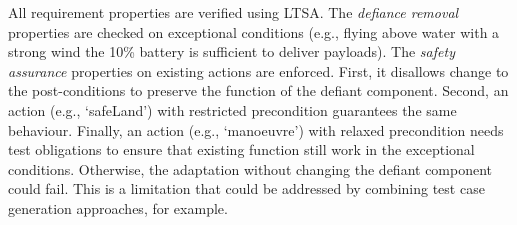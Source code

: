 All requirement properties are verified using LTSA.
%
The {\it defiance removal} properties are checked on exceptional conditions (e.g., flying above water with a strong wind the 10\% battery is sufficient to deliver payloads).
%
The {\it safety assurance} properties on existing actions are enforced. First, it disallows change to the post-conditions to preserve the function of the defiant component. %
Second, an action (e.g., `safeLand') with restricted precondition guarantees the same behaviour. Finally, an action (e.g., `manoeuvre') with relaxed precondition needs test obligations to ensure that existing function still work in the exceptional conditions. Otherwise, the adaptation without changing the defiant component could fail. This is a limitation that could be addressed by combining test case generation approaches, for example. 

